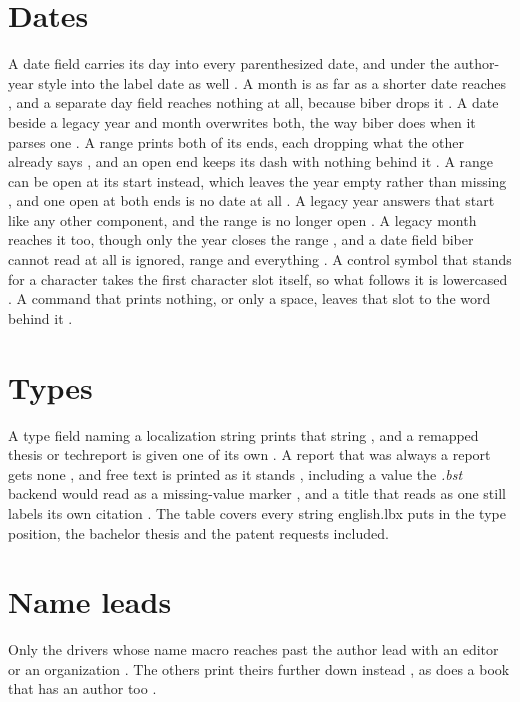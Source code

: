 \documentclass[acmsmall,nonacm,natbib=false]{acmart}
\begin{document}
\thispagestyle{empty}

\section*{Dates}
A date field carries its day into every parenthesized date, and under the author-year style into the label date as well \cite{DtArticle,DtMisc,DtBook,DtReport,DtPatent}.
A month is as far as a shorter date reaches \cite{DtMonth,DtShortMonth}, and a separate day field reaches nothing at all, because biber drops it \cite{DtDayField}.
A date beside a legacy year and month overwrites both, the way biber does when it parses one \cite{DtOverwrite}.
A range prints both of its ends, each dropping what the other already says \cite{DtRange,DtCrossRange,DtYearRange}, and an open end keeps its dash with nothing behind it \cite{DtOpenRange}.
A range can be open at its start instead, which leaves the year empty rather than missing \cite{DtOpenStart}, and one open at both ends is no date at all \cite{DtBothOpen}.
A legacy year answers that start like any other component, and the range is no longer open \cite{DtLegacyStart}.
A legacy month reaches it too, though only the year closes the range \cite{DtMonthOnly}, and a date field biber cannot read at all is ignored, range and everything \cite{DtNoDate}.
A control symbol that stands for a character takes the first character slot itself, so what follows it is lowercased \cite{ScAmp,ScPct}.
A command that prints nothing, or only a space, leaves that slot to the word behind it \cite{ScRelax,ScSpace,ScSlash,ScThin}.

\section*{Types}
A type field naming a localization string prints that string \cite{TyCand,TyRes,TySoftware,TyManual,TyDataset,TyPatent}, and a remapped thesis or techreport is given one of its own \cite{TyTechNone,TyPhd,TyMa}.
A report that was always a report gets none \cite{TyReportNone}, and free text is printed as it stands \cite{TyFree}, including a value the \emph{.bst} backend would read as a missing-value marker \cite{TyMarker}, and a title that reads as one still labels its own citation \cite{TyMarkerLabel}.
The table covers every string english.lbx puts in the type position, the bachelor thesis \cite{TyBachelor} and the patent requests \cite{TyPatreq,TyPatrequs} included.

\section*{Name leads}
Only the drivers whose name macro reaches past the author lead with an editor or an organization \cite{LdEditorOne,LdEditorTwo,LdEditorMisc,LdOrg}.
The others print theirs further down instead \cite{LdArticle,LdIncoll,LdInproc}, as does a book that has an author too \cite{LdBoth}.
\end{document}
